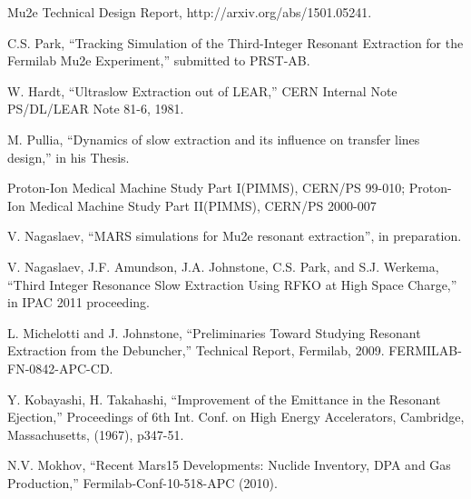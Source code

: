 \documentclass[aps,prstab,onecolumn,preprint,endfloats,11pt]{revtex4-1}
\begin{document}
\begin{thebibliography}{77}
  Mu2e Technical Design Report, http://arxiv.org/abs/1501.05241.

  C.S. Park, ``Tracking Simulation of the Third-Integer Resonant Extraction for the Fermilab Mu2e Experiment,'' submitted to PRST-AB.

  W. Hardt, ``Ultraslow Extraction out of LEAR,'' CERN Internal Note PS/DL/LEAR Note 81-6, 1981.

  M. Pullia, ``Dynamics of slow extraction and its influence on transfer lines design,'' in his Thesis.

  Proton-Ion Medical Machine Study Part I(PIMMS), CERN/PS 99-010; Proton-Ion Medical Machine Study Part II(PIMMS), CERN/PS 2000-007


  V. Nagaslaev, ``MARS simulations for Mu2e resonant extraction'', in preparation.

  V. Nagaslaev, J.F. Amundson, J.A. Johnstone, C.S. Park, and S.J. Werkema,  ``Third Integer Resonance Slow Extraction Using RFKO at High Space Charge,'' in  IPAC 2011 proceeding.

  L. Michelotti and J. Johnstone, ``Preliminaries Toward Studying Resonant Extraction from the Debuncher,'' Technical Report, Fermilab, 2009. FERMILAB-FN-0842-APC-CD.

  Y. Kobayashi, H. Takahashi, ``Improvement of the Emittance in the Resonant Ejection,'' Proceedings of 6th Int. Conf. on High Energy Accelerators, Cambridge, Massachusetts, (1967), p347-51.

  N.V. Mokhov, ``Recent Mars15 Developments: Nuclide Inventory, DPA and Gas Production,'' Fermilab-Conf-10-518-APC (2010).


\end{thebibliography}
\end{document}
